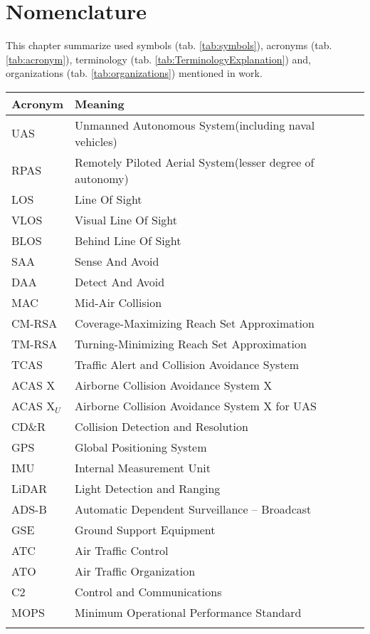 \section*{Nomenclature}
\noindent
This chapter summarize used symbols (tab. \ref{tab:symbols}), acronyms (tab. \ref{tab:acronym}), terminology (tab. \ref{tab:TerminologyExplanation}) and, organizations (tab. \ref{tab:organizations}) mentioned in work. 

\begin{tabularx}{\textwidth}{l|X} 
    Acronym & Meaning\\ \hline\hline
    UAS & Unmanned Autonomous System(including naval vehicles)\\ 
    RPAS & Remotely Piloted Aerial System(lesser degree of autonomy)\\\hline
    LOS & Line Of Sight\\ 
    VLOS & Visual Line Of Sight\\ 
    BLOS & Behind Line Of Sight\\ \hline
    SAA & Sense And Avoid\\ 
    DAA & Detect And Avoid \\ 
    MAC & Mid-Air Collision \\
    CM-RSA & Coverage-Maximizing Reach Set Approximation\\
    TM-RSA & Turning-Minimizing Reach Set Approximation\\
    TCAS &Traffic Alert and Collision Avoidance System\\
    ACAS X & Airborne Collision Avoidance System X\\
    ACAS X$_U$ & Airborne Collision Avoidance System X for UAS\\
    CD\&R & Collision Detection and Resolution\\ \hline 
    GPS & Global Positioning System\\ 
    IMU & Internal Measurement Unit\\ 
    LiDAR &  Light Detection and Ranging \\ 
    ADS-B & Automatic Dependent Surveillance – Broadcast\\ 
    GSE & Ground Support Equipment\\\hline
    ATC & Air Traffic Control \\
    ATO & Air Traffic Organization\\
    C2 & Control and Communications\\\hline
    MOPS & Minimum Operational Performance Standard\\
    \caption{List of Acronyms}
    \label{tab:acronym}
\end{tabularx}

